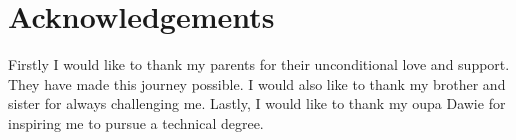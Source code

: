 \chapter*{Acknowledgements}
\makeatletter{}\makeatother

Firstly I would like to thank my parents for their unconditional love and support. They have made this journey possible. I would also like to thank my brother and sister for always challenging me. Lastly, I would like to thank my oupa Dawie for inspiring me to pursue a technical degree. 